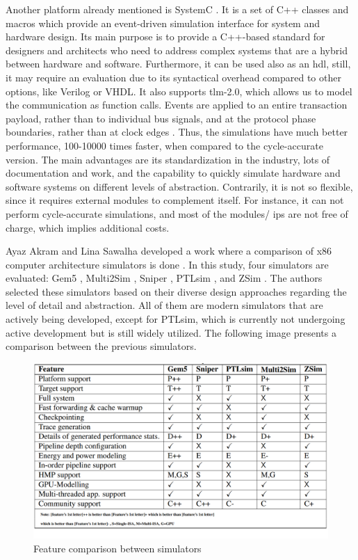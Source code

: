 Another platform already mentioned is SystemC \cite{systemC}. It is a set of C++ classes and macros which provide an event-driven simulation 
interface for system and hardware design. Its main purpose is to provide a C++-based standard for designers and architects who need to address 
complex systems that are a hybrid between hardware and software. Furthermore, it can be used also as an \gls{hdl}, still, it may require an 
evaluation due to its syntactical overhead compared to other options, like Verilog or VHDL. It also supports \gls{tlm}-2.0, which allows us to 
model the communication as function calls. Events are applied to an entire transaction payload, rather than to individual bus signals, and at 
the protocol phase
boundaries, rather than at clock edges \cite{wieman2012overview}. Thus, the simulations have much better performance, 100-10000 times faster, 
when compared to the cycle-accurate version. The main advantages are its standardization in the industry, lots of documentation and work, and 
the capability to quickly simulate hardware and software systems on different levels of abstraction. Contrarily, it is not so flexible, since  
it requires external modules to complement itself. For instance, it can not perform cycle-accurate simulations, and most of the modules/
\glspl{ip} are not free of charge, which implies additional costs.


Ayaz Akram and Lina Sawalha developed a work where a comparison of x86 computer architecture simulators is done \cite{akram2016comparison}. In 
this study, four simulators are evaluated: Gem5 \cite{TheGem5Simulator}, Multi2Sim \cite{ubal2012multi2sim}, Sniper \cite{carlson2011sniper}, 
PTLsim \cite{yourst2007ptlsim}, and ZSim \cite{sanchez2013zsim}. The authors selected these simulators based on their diverse design approaches 
regarding the level of detail and abstraction. All of them are modern simulators that are actively being developed, except for PTLsim, which is 
currently not undergoing active development but is still widely utilized. The following image presents a comparison between the 
previous simulators. 

\begin{figure}[H]
	\centering
 	\includegraphics[width=0.7\linewidth]{Images/ComparationTableSimulators.png}
 	\caption{Feature comparison between simulators \cite{akram2016comparison}}
	 \label{fig_ComparationTableSimulators}
\end{figure}

